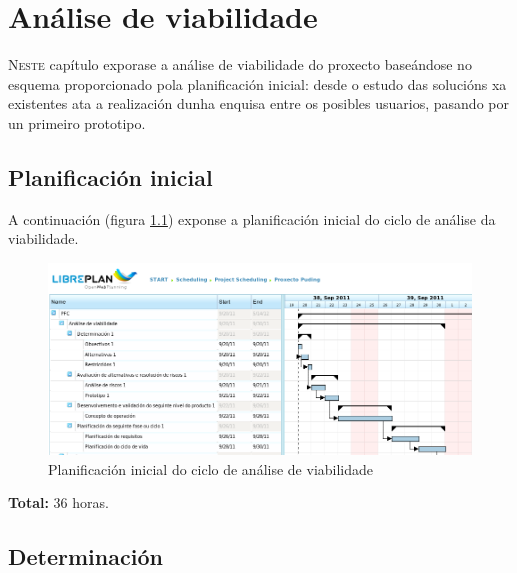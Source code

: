 \chapter{Análise de viabilidade}
\minitoc
\label{chap:viabilidad}
\vspace{0.5cm}


\lettrine{N}{este} capítulo exporase a análise de viabilidade do proxecto
baseándose no esquema proporcionado pola planificación inicial: desde o estudo
das solucións xa existentes ata a realización dunha enquisa entre os posibles
usuarios, pasando por un primeiro prototipo.

\section{Planificación inicial}

A continuación (figura \ref{figura:PlanificacionInicialViabilidade}) exponse a
planificación inicial do ciclo de análise da viabilidade.

\begin{figure}[htbp]
 \centering
 \includegraphics[scale=0.6,keepaspectratio=true]{./imagenes/viabilidade.png}
 \caption{Planificación inicial do ciclo de análise de viabilidade}
 \label{figura:PlanificacionInicialViabilidade}
\end{figure}

\textbf{Total:} 36 horas.

\section{Determinación}

